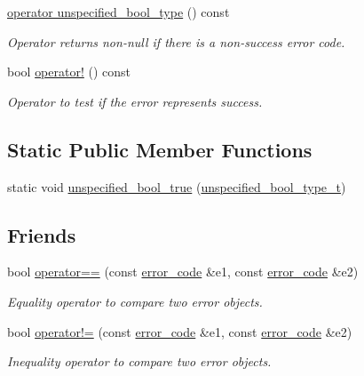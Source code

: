 \begin{DoxyCompactItemize}
\hyperlink{classasio_1_1error__code_a59079ef5561511d91db80165a6b83866}{operator unspecified\+\_\+bool\+\_\+type} () const 
\begin{DoxyCompactList}\small\item\em Operator returns non-\/null if there is a non-\/success error code. \end{DoxyCompactList}\item 
bool \hyperlink{classasio_1_1error__code_aa1c72b68d788a7330ceb0cb76a10fd3f}{operator!} () const 
\begin{DoxyCompactList}\small\item\em Operator to test if the error represents success. \end{DoxyCompactList}\end{DoxyCompactItemize}
\subsection*{Static Public Member Functions}
\begin{DoxyCompactItemize}
\item 
static void \hyperlink{classasio_1_1error__code_a192fa8d6241e610e7853cb6d67c2ff77}{unspecified\+\_\+bool\+\_\+true} (\hyperlink{structasio_1_1error__code_1_1unspecified__bool__type__t}{unspecified\+\_\+bool\+\_\+type\+\_\+t})
\end{DoxyCompactItemize}
\subsection*{Friends}
\begin{DoxyCompactItemize}
\item 
bool \hyperlink{classasio_1_1error__code_a69c5201edb7cd254a46b868307fe870d}{operator==} (const \hyperlink{classasio_1_1error__code}{error\+\_\+code} \&e1, const \hyperlink{classasio_1_1error__code}{error\+\_\+code} \&e2)
\begin{DoxyCompactList}\small\item\em Equality operator to compare two error objects. \end{DoxyCompactList}\item 
bool \hyperlink{classasio_1_1error__code_a420983e73984d289ade7b4afe81fec4f}{operator!=} (const \hyperlink{classasio_1_1error__code}{error\+\_\+code} \&e1, const \hyperlink{classasio_1_1error__code}{error\+\_\+code} \&e2)
\begin{DoxyCompactList}\small\item\em Inequality operator to compare two error objects. \end{DoxyCompactList}\end{DoxyCompactItemize}


